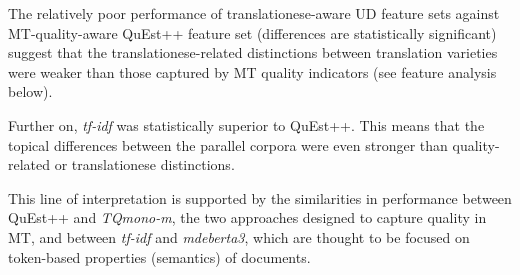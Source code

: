 The relatively poor performance of translationese-aware UD feature sets against MT-quality-aware QuEst++ feature set (differences are statistically significant) suggest that the translationese-related distinctions between translation varieties were weaker than those captured by MT quality indicators (see feature analysis below).

Further on, \textit{tf-idf} was statistically superior to QuEst++. This means that the topical differences between the parallel corpora were even stronger than quality-related or translationese distinctions.

This line of interpretation is supported by the similarities in performance between QuEst++ and \textit{TQmono-m}, the two approaches designed to capture quality in MT, and between \textit{tf-idf} and \textit{mdeberta3}, which are thought to be focused on token-based properties (semantics) of documents. 


